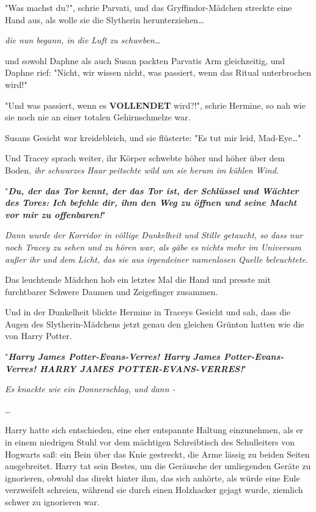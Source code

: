 {"Was machst du?", schrie Parvati, und das Gryffindor-Mädchen streckte eine Hand aus, als wolle sie die Slytherin herunterziehen…

\emph{die nun begann, in die Luft zu schweben…}

und sowohl Daphne als auch Susan packten Parvatis Arm gleichzeitig, und Daphne rief: "Nicht, wir wissen nicht, was passiert, wenn das Ritual unterbrochen wird!"

"Und was passiert, wenn es \textbf{VOLLENDET} wird?!", schrie Hermine, so nah wie sie noch nie an einer totalen Gehirnschmelze war.

Susans Gesicht war kreidebleich, und sie flüsterte: "Es tut mir leid, Mad-Eye…"

Und Tracey sprach weiter, ihr Körper schwebte höher und höher über dem Boden, \emph{ihr schwarzes Haar peitschte wild um sie herum im kühlen Wind.}

"\textbf{\emph{Du, der das Tor kennt, der das Tor ist, der Schlüssel und Wächter des Tores: Ich befehle dir, ihm den Weg zu öffnen und seine Macht vor mir zu offenbaren!}}"

\emph{Dann wurde der Korridor in völlige Dunkelheit und Stille getaucht, so dass nur noch Tracey zu sehen und zu hören war, als gäbe es nichts mehr im Universum außer ihr und dem Licht, das sie aus irgendeiner namenlosen Quelle beleuchtete}.

Das leuchtende Mädchen hob ein letztes Mal die Hand und presste mit furchtbarer Schwere Daumen und Zeigefinger zusammen.

Und in der Dunkelheit blickte Hermine in Traceys Gesicht und sah, dass die Augen des Slytherin-Mädchens jetzt genau den gleichen Grünton hatten wie die von Harry Potter.

"\textbf{\emph{Harry James Potter-Evans-Verres! Harry James Potter-Evans-Verres! HARRY JAMES POTTER-EVANS-VERRES!}}"

\emph{Es knackte wie ein Donnerschlag, und dann -}

…

Harry hatte sich entschieden, eine eher entspannte Haltung einzunehmen, als er in einem niedrigen Stuhl vor dem mächtigen Schreibtisch des Schulleiters von Hogwarts saß: ein Bein über das Knie gestreckt, die Arme lässig zu beiden Seiten ausgebreitet. Harry tat sein Bestes, um die Geräusche der umliegenden Geräte zu ignorieren, obwohl das direkt hinter ihm, das sich anhörte, als würde eine Eule verzweifelt schreien, während sie durch einen Holzhacker gejagt wurde, ziemlich schwer zu ignorieren war.

}
